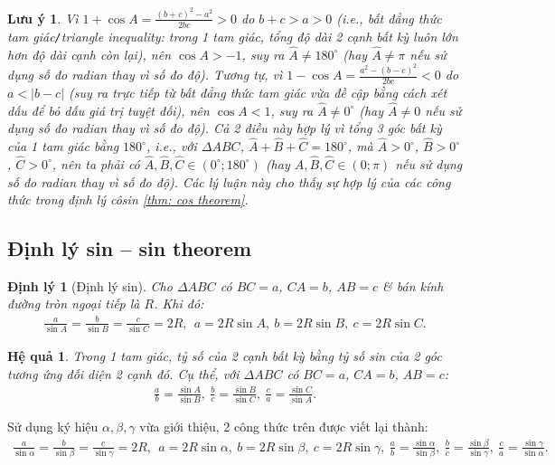 \documentclass[oneside]{book}
\numberwithin{equation}{section}
\newtheorem{hequa}{Hệ quả}[section]
\newtheorem{luuy}{Lưu ý}[section]
\newtheorem{dinhly}{Định lý}[section]
\begin{document}
\begin{luuy}
	\label{luu y:khoang gia tri 3 goc tam giac}
	Vì $1 + \cos A = \frac{(b + c)^2 - a^2}{2bc} > 0$ do $b + c > a > 0$ (i.e., \textit{bất đẳng thức tam giác}\emph{\texttt{/}}\textit{triangle inequality}: trong 1 tam giác, tổng độ dài 2 cạnh bất kỳ luôn lớn hơn độ dài cạnh còn lại), nên $\cos A > -1$, suy ra $\widehat{A}\ne 180^\circ$ (hay $\widehat{A}\ne\pi$ nếu sử dụng số đo radian thay vì số đo độ). Tương tự, vì $1 - \cos A = \frac{a^2 - (b - c)^2}{2bc} < 0$ do $a < |b - c|$ (suy ra trực tiếp từ bất đẳng thức tam giác vừa đề cập bằng cách xét dấu để bỏ dấu giá trị tuyệt đối), nên $\cos A < 1$, suy ra $\widehat{A}\ne 0^\circ$ (hay $\widehat{A}\ne 0$  nếu sử dụng số đo radian thay vì số đo độ). Cả 2 điều này hợp lý vì tổng 3 góc bất kỳ của 1 tam giác bằng $180^\circ$, i.e., với $\Delta ABC$, $\widehat{A} + \widehat{B} + \widehat{C} = 180^\circ$, mà $\widehat{A} > 0^\circ$, $\widehat{B} > 0^\circ$, $\widehat{C} > 0^\circ$, nên ta phải có $\widehat{A},\widehat{B},\widehat{C}\in(0^\circ;180^\circ)$ (hay $\widehat{A},\widehat{B},\widehat{C}\in(0;\pi)$ nếu sử dụng số đo radian thay vì số đo độ). Các lý luận này cho thấy sự hợp lý của các công thức trong định lý côsin \ref{thm: cos theorem}.
\end{luuy}

\subsection{Định lý sin -- sin theorem}

\begin{dinhly}[Định lý sin]
	\label{thm: sin theorem}
	Cho $\Delta ABC$ có $BC = a$, $CA = b$, $AB = c$ \& bán kính đường tròn ngoại tiếp là $R$. Khi đó:
	\begin{align*}
		\frac{a}{\sin A} = \frac{b}{\sin B} = \frac{c}{\sin C} = 2R,\ \ a = 2R\sin A,\ b = 2R\sin B,\ c = 2R\sin C.
	\end{align*}
\end{dinhly}

\begin{hequa}
	\label{corollary: sin theorem}
	Trong 1 tam giác, tỷ số của 2 cạnh bất kỳ bằng tỷ số sin của 2 góc tương ứng đối diện 2 cạnh đó. Cụ thể, với $\Delta ABC$ có $BC = a$, $CA = b$, $AB = c$:
	\begin{align*}
		 \frac{a}{b} = \frac{\sin A}{\sin B},\ \frac{b}{c} = \frac{\sin B}{\sin C},\ \frac{c}{a} = \frac{\sin C}{\sin A}.
	\end{align*}
\end{hequa}
Sử dụng ký hiệu $\alpha,\beta,\gamma$ vừa giới thiệu, 2 công thức trên được viết lại thành:
\begin{align*}
	\frac{a}{\sin\alpha} = \frac{b}{\sin\beta} = \frac{c}{\sin\gamma} = 2R,\ \ a = 2R\sin\alpha,\ b = 2R\sin\beta,\ c = 2R\sin\gamma,\ \frac{a}{b} = \frac{\sin\alpha}{\sin\beta},\ \frac{b}{c} = \frac{\sin\beta}{\sin\gamma},\ \frac{c}{a} = \frac{\sin\gamma}{\sin\alpha}.
\end{align*}
\end{document}
